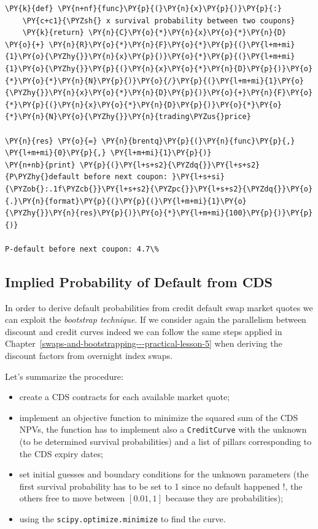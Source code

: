 {\begin{tcolorbox}[breakable, size=fbox, boxrule=1pt, pad at break*=1mm,colback=cellbackground, colframe=cellborder]
\begin{Verbatim}[commandchars=\\\{\}]
\PY{k}{def} \PY{n+nf}{func}\PY{p}{(}\PY{n}{x}\PY{p}{)}\PY{p}{:}
	\PY{c+c1}{\PYZsh{} x survival probability between two coupons}
	\PY{k}{return} \PY{n}{C}\PY{o}{*}\PY{n}{x}\PY{o}{*}\PY{n}{D} \PY{o}{+} \PY{n}{R}\PY{o}{*}\PY{n}{F}\PY{o}{*}\PY{p}{(}\PY{l+m+mi}{1}\PY{o}{\PYZhy{}}\PY{n}{x}\PY{p}{)}\PY{o}{*}\PY{p}{(}\PY{l+m+mi}{1}\PY{o}{\PYZhy{}}\PY{p}{(}\PY{n}{x}\PY{o}{*}\PY{n}{D}\PY{p}{)}\PY{o}{*}\PY{o}{*}\PY{n}{N}\PY{p}{)}\PY{o}{/}\PY{p}{(}\PY{l+m+mi}{1}\PY{o}{\PYZhy{}}\PY{n}{x}\PY{o}{*}\PY{n}{D}\PY{p}{)}\PY{o}{+}\PY{n}{F}\PY{o}{*}\PY{p}{(}\PY{n}{x}\PY{o}{*}\PY{n}{D}\PY{p}{)}\PY{o}{*}\PY{o}{*}\PY{n}{N}\PY{o}{\PYZhy{}}\PY{n}{trading\PYZus{}price}
	
\PY{n}{res} \PY{o}{=} \PY{n}{brentq}\PY{p}{(}\PY{n}{func}\PY{p}{,} \PY{l+m+mi}{0}\PY{p}{,} \PY{l+m+mi}{1}\PY{p}{)}
\PY{n+nb}{print} \PY{p}{(}\PY{l+s+s2}{\PYZdq{}}\PY{l+s+s2}{P\PYZhy{}default before next coupon: }\PY{l+s+si}{\PYZob{}:.1f\PYZcb{}}\PY{l+s+s2}{\PYZpc{}}\PY{l+s+s2}{\PYZdq{}}\PY{o}{.}\PY{n}{format}\PY{p}{(}\PY{p}{(}\PY{l+m+mi}{1}\PY{o}{\PYZhy{}}\PY{n}{res}\PY{p}{)}\PY{o}{*}\PY{l+m+mi}{100}\PY{p}{)}\PY{p}{)}

P-default before next coupon: 4.7\%
\end{Verbatim}
\end{tcolorbox}

\subsection{Implied Probability of Default from CDS}\label{default-probabilities-and-cds}

In order to derive default probabilities from credit default swap market quotes we can exploit the \emph{bootstrap technique}. If we consider again the parallelism between discount and credit curves indeed we can follow the same steps applied in Chapter~\ref{swaps-and-bootstrapping---practical-lesson-5} when deriving the discount factors from overnight index swaps.

Let's summarize the procedure: 
\begin{itemize}
\tightlist
\item create a CDS contracts for each available market quote;
\item implement an objective function to minimize the squared sum of the CDS
	NPVs, the function has to implement also a \texttt{CreditCurve} with
	the unknown (to be determined survival probabilities) and a list of pillars corresponding to the CDS expiry dates;
\item set initial guesses and boundary conditions for the
	unknown parameters (the first survival probability has to be set to 1
	since no default happened !, the others free to move between $[0.01, 1]$ because they are probabilities);
\item using the \texttt{scipy.optimize.minimize} to find the curve.
\end{itemize}

}
